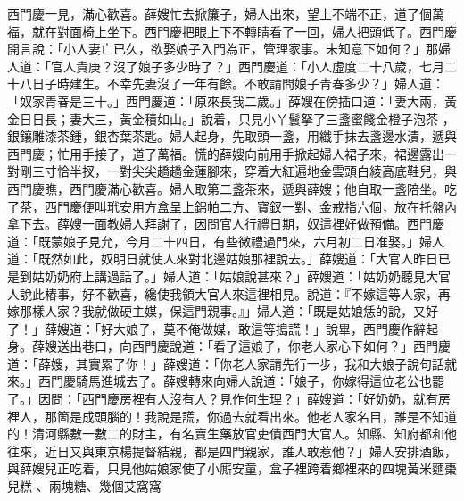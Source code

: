 西門慶一見，滿心歡喜。薛嫂忙去掀簾子，婦人出來，望上不端不正，道了個萬福，就在對面椅上坐下。西門慶把眼上下不轉睛看了一回，婦人把頭低了。西門慶開言說：「小人妻亡已久，欲娶娘子入門為正，管理家事。未知意下如何？」那婦人道：「官人貴庚？沒了娘子多少時了？」西門慶道：「小人虛度二十八歲，七月二十八日子時建生。不幸先妻沒了一年有餘。不敢請問娘子青春多少？」婦人道：「奴家青春是三十。」西門慶道：「原來長我二歲。」薛嫂在傍插口道：「妻大兩，黃金日日長；妻大三，黃金積如山。」說着，只見小丫鬟拏了三盞蜜餞金橙子泡茶 ，銀鑲雕漆茶鍾，銀杏葉茶匙。婦人起身，先取頭一盞，用纖手抹去盞邊水漬，遞與西門慶；忙用手接了，道了萬福。慌的薛嫂向前用手掀起婦人裙子來，裙邊露出一對剛三寸恰半扠，一對尖尖趫趫金蓮腳來，穿着大紅遍地金雲頭白綾高底鞋兒，與西門慶瞧，西門慶滿心歡喜。婦人取第二盞茶來，遞與薛嫂；他自取一盞陪坐。吃了茶，西門慶便叫玳安用方盒呈上錦帕二方、寶釵一對、金戒指六個，放在托盤內拿下去。薛嫂一面教婦人拜謝了，因問官人行禮日期，奴這裡好做預備。西門慶道：「既蒙娘子見允，今月二十四日，有些微禮過門來，六月初二日准娶。」婦人道：「既然如此，奴明日就使人來對北邊姑娘那裡說去。」薛嫂道：「大官人昨日已是到姑奶奶府上講過話了。」婦人道：「姑娘說甚來？」薛嫂道：「姑奶奶聽見大官人說此樁事，好不歡喜，纔使我領大官人來這裡相見。說道：『不嫁這等人家，再嫁那樣人家？我就做硬主媒，保這門親事。』」婦人道：「既是姑娘恁的說，又好了！」薛嫂道：「好大娘子，莫不俺做媒，敢這等搗謊！」說畢，西門慶作辭起身。薛嫂送出巷口，向西門慶說道：「看了這娘子，你老人家心下如何？」西門慶道：「薛嫂，其實累了你！」薛嫂道：「你老人家請先行一步，我和大娘子說句話就來。」西門慶騎馬進城去了。薛嫂轉來向婦人說道：「娘子，你嫁得這位老公也罷了。」因問：「西門慶房裡有人沒有人？見作何生理？」薛嫂道：「好奶奶，就有房裡人，那箇是成頭腦的！我說是謊，你過去就看出來。他老人家名目，誰是不知道的！清河縣數一數二的財主，有名賣生藥放官吏債西門大官人。知縣、知府都和他往來，近日又與東京楊提督結親，都是四門親家，誰人敢惹他？」婦人安排酒飯，與薛嫂兒正吃着，只見他姑娘家使了小廝安童，盒子裡跨着鄉裡來的四塊黃米麵棗兒糕 、兩塊糖、幾個艾窩窩 